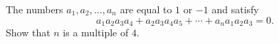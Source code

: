 The numbers $a_1, a_2, \ldots, a_n$ are equal to $1$ or $-1$ and satisfy
\[
a_1a_2a_3a_4 + a_2a_3a_4a_5 + \cdots + a_na_1a_2a_3 = 0.
\]
Show that $n$ is a multiple of $4$.
